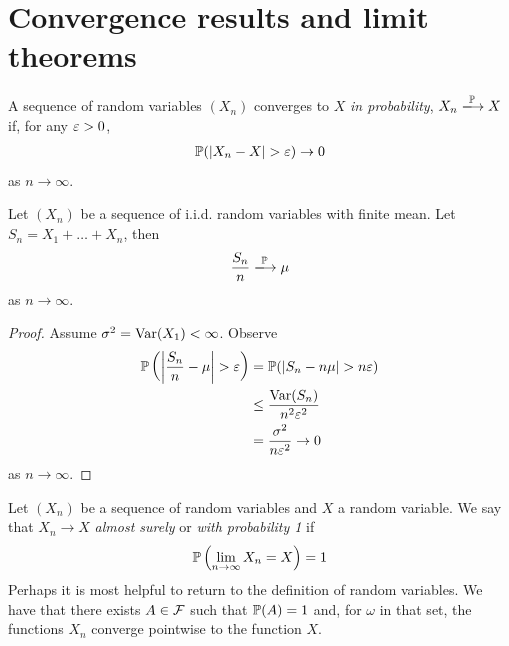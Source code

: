 \documentclass{../../template/note}
\begin{document}
    \section{Convergence results and limit theorems}
    
    \begin{definition}
        A sequence of random variables \((X_n)\) converges to \(X\) \emph{in probability}, \(X_n \pto X\) if, for any \(\varepsilon > 0\),
        \begin{align*}
            \mathbb P(|X_n-X| > \varepsilon) \to 0
        \end{align*}
        as \(n \to \infty\).
    \end{definition}
    
    \begin{theorem}
        Let \((X_n)\) be a sequence of i.i.d. random variables with finite mean. Let \(S_n = X_1 + \dots + X_n\), then 
        \begin{align*}
            \frac{S_n}{n} \pto \mu
        \end{align*}
        as \(n \to \infty\).
    \end{theorem}
    
    \begin{proof}
        Assume \(\sigma^2 = \operatorname{Var}(X_1) < \infty\). Observe
        \begin{align*}
            \mathbb P\left(\left|\frac{S_n}{n}-\mu\right| > \varepsilon\right) &= \mathbb P(|S_n - n\mu| > n\varepsilon) \\
            &\leq \frac{\operatorname{Var}(S_n)}{n^2\varepsilon^2} \\
            &= \frac{\sigma^2}{n\varepsilon^2} \to 0
        \end{align*}
        as \(n \to \infty\).
    \end{proof}
    
    \begin{definition}
        Let \((X_n)\) be a sequence of random variables and \(X\) a random variable. We say that \(X_n \to X\) \emph{almost surely} or \emph{with probability 1} if
        \begin{align*}
            \mathbb P\left(\lim_{n \to \infty} X_n = X\right) = 1
        \end{align*}
        Perhaps it is most helpful to return to the definition of random variables. We have that there exists \(A \in \mathcal{F}\) such that \(\mathbb P(A) = 1\) and, for \(\omega\) in that set, the functions \(X_n\) converge pointwise to the function \(X\).
    \end{definition}
    
\end{document}

